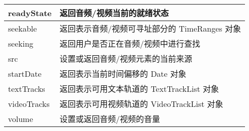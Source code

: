 \begin{longtable}{|p{80pt}|p{280pt}|}
\hline
readyState		&返回音频/视频当前的就绪状态\\
\hline
seekable			&返回表示音频/视频可寻址部分的 TimeRanges 对象\\
\hline
seeking			&返回用户是否正在音频/视频中进行查找\\
\hline
src				&设置或返回音频/视频元素的当前来源\\
\hline
startDate			&返回表示当前时间偏移的 Date 对象\\
\hline
textTracks		&返回表示可用文本轨道的 TextTrackList 对象\\
\hline
videoTracks		&返回表示可用视频轨道的 VideoTrackList 对象\\
\hline
volume			&设置或返回音频/视频的音量\\
\hline
\end{longtable}




